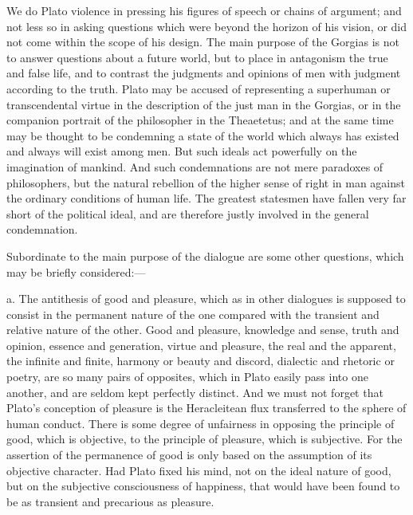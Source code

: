 \documentclass[11pt,letter]{article}
\begin{document}
\par  We do Plato violence in pressing his figures of speech or chains of argument; and not less so in asking questions which were beyond the horizon of his vision, or did not come within the scope of his design. The main purpose of the Gorgias is not to answer questions about a future world, but to place in antagonism the true and false life, and to contrast the judgments and opinions of men with judgment according to the truth. Plato may be accused of representing a superhuman or transcendental virtue in the description of the just man in the Gorgias, or in the companion portrait of the philosopher in the Theaetetus; and at the same time may be thought to be condemning a state of the world which always has existed and always will exist among men. But such ideals act powerfully on the imagination of mankind. And such condemnations are not mere paradoxes of philosophers, but the natural rebellion of the higher sense of right in man against the ordinary conditions of human life. The greatest statesmen have fallen very far short of the political ideal, and are therefore justly involved in the general condemnation.

\par  Subordinate to the main purpose of the dialogue are some other questions, which may be briefly considered:—

\par  a. The antithesis of good and pleasure, which as in other dialogues is supposed to consist in the permanent nature of the one compared with the transient and relative nature of the other. Good and pleasure, knowledge and sense, truth and opinion, essence and generation, virtue and pleasure, the real and the apparent, the infinite and finite, harmony or beauty and discord, dialectic and rhetoric or poetry, are so many pairs of opposites, which in Plato easily pass into one another, and are seldom kept perfectly distinct. And we must not forget that Plato’s conception of pleasure is the Heracleitean flux transferred to the sphere of human conduct. There is some degree of unfairness in opposing the principle of good, which is objective, to the principle of pleasure, which is subjective. For the assertion of the permanence of good is only based on the assumption of its objective character. Had Plato fixed his mind, not on the ideal nature of good, but on the subjective consciousness of happiness, that would have been found to be as transient and precarious as pleasure.
\end{document}
